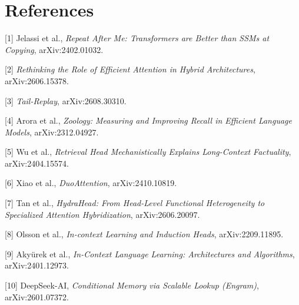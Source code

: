\documentclass[10pt]{article}
\begin{document}
\clearpage
\section*{References}
\small
\setlength{\parskip}{4pt}\raggedright

[1] Jelassi et al., \emph{Repeat After Me: Transformers are Better than SSMs at Copying}, arXiv:2402.01032.

[2] \emph{Rethinking the Role of Efficient Attention in Hybrid Architectures}, arXiv:2606.15378.

[3] \emph{Tail-Replay}, arXiv:2608.30310.

[4] Arora et al., \emph{Zoology: Measuring and Improving Recall in Efficient Language Models}, arXiv:2312.04927.

[5] Wu et al., \emph{Retrieval Head Mechanistically Explains Long-Context Factuality}, arXiv:2404.15574.

[6] Xiao et al., \emph{DuoAttention}, arXiv:2410.10819.

[7] Tan et al., \emph{HydraHead: From Head-Level Functional Heterogeneity to Specialized Attention Hybridization}, arXiv:2606.20097.

[8] Olsson et al., \emph{In-context Learning and Induction Heads}, arXiv:2209.11895.

[9] Akyürek et al., \emph{In-Context Language Learning: Architectures and Algorithms}, arXiv:2401.12973.

[10] DeepSeek-AI, \emph{Conditional Memory via Scalable Lookup (Engram)}, arXiv:2601.07372.
\end{document}
